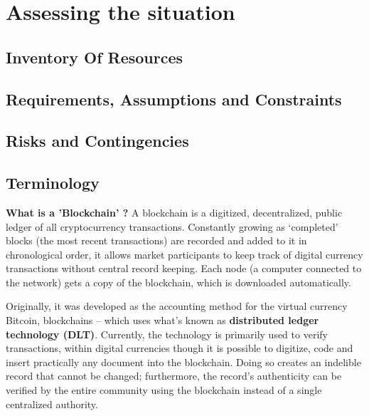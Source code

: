 \documentclass{article}
\begin{document}
\section{Assessing the situation}
\subsection{Inventory Of Resources}

\subsection{Requirements, Assumptions and Constraints}

\subsection{Risks and Contingencies}

\subsection{Terminology}
\textbf{What is a 'Blockchain' ?}
A blockchain is a digitized, decentralized, public ledger of all cryptocurrency transactions. Constantly growing as ‘completed’ blocks (the most recent transactions) are recorded and added to it in chronological order, it allows market participants to keep track of digital currency transactions without central record keeping. Each node (a computer connected to the network) gets a copy of the blockchain, which is downloaded automatically.

Originally, it was developed as the accounting method for the virtual currency Bitcoin, blockchains – which uses what's known as \textbf{distributed ledger technology (DLT)}. Currently, the technology is primarily used to verify transactions, within digital currencies though it is possible to digitize, code and insert practically any document into the blockchain. Doing so creates an indelible record that cannot be changed; furthermore, the record’s authenticity can be verified by the entire community using the blockchain instead of a single centralized authority.
\end{document}
